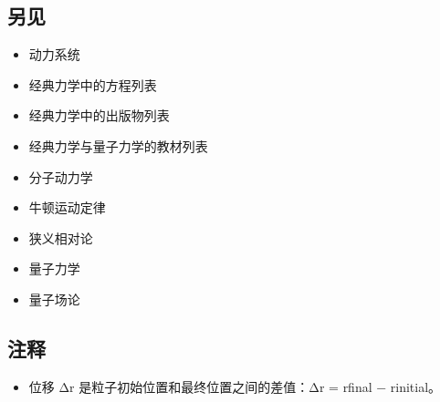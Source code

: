 \subsection{另见} 
\begin{itemize}
\item 动力系统  
\item 经典力学中的方程列表  
\item 经典力学中的出版物列表  
\item 经典力学与量子力学的教材列表  
\item 分子动力学  
\item 牛顿运动定律  
\item 狭义相对论  
\item 量子力学  
\item 量子场论  
\end{itemize}
\subsection{注释}
\begin{itemize}
\item 位移 Δr 是粒子初始位置和最终位置之间的差值：Δr = rfinal − rinitial。
\end{itemize}
